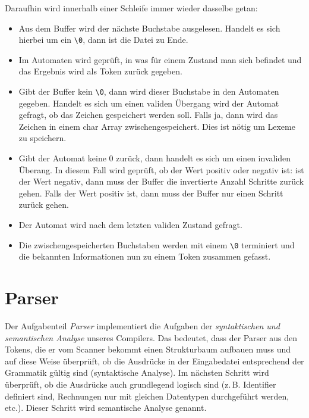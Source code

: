 \documentclass[listof=totoc,DIV11,a4paper]{scrreprt}
\begin{document}
Daraufhin wird innerhalb einer Schleife immer wieder dasselbe getan:
\begin{itemize}

\item Aus dem Buffer wird der nächste Buchstabe ausgelesen. Handelt es sich hierbei um ein \verb+\0+, dann ist die Datei zu Ende. 

\item Im Automaten wird geprüft, in was für einem Zustand man sich befindet und das Ergebnis wird als Token zurück gegeben.

\item Gibt der Buffer kein \verb+\0+, dann wird dieser Buchstabe in den Automaten gegeben. Handelt es sich um einen validen Übergang wird der Automat gefragt, ob das Zeichen gespeichert werden soll. Falls ja, dann wird das Zeichen in einem char Array zwischengespeichert. Dies ist nötig um Lexeme zu speichern.

\item Gibt der Automat keine 0 zurück, dann handelt es sich um einen invaliden Überang. In diesem Fall wird geprüft, ob der Wert positiv oder negativ ist: ist der Wert negativ, dann muss der Buffer die invertierte Anzahl Schritte zurück gehen. Falls der Wert positiv ist, dann muss der Buffer nur einen Schritt zurück gehen. 

\item Der Automat wird nach dem letzten validen Zustand gefragt. 

\item Die zwischengespeicherten Buchstaben werden mit einem \verb+\0+ terminiert und die bekannten Informationen nun zu einem Token zusammen gefasst.

\end{itemize}
\chapter{Parser}\label{kap:parser}
Der Aufgabenteil \emph{Parser} implementiert die Aufgaben der \emph{syntaktischen und semantischen Analyse} unseres Compilers. Das bedeutet, dass der Parser aus den Tokens, die er vom Scanner bekommt einen Strukturbaum aufbauen muss und auf diese Weise überprüft, ob die Ausdrücke in der Eingabedatei entsprechend der Grammatik gültig sind (syntaktische Analyse). Im nächsten Schritt wird überprüft, ob die Ausdrücke auch grundlegend logisch sind (z.\,B. Identifier definiert sind, Rechnungen nur mit gleichen Datentypen durchgeführt werden, etc.). Dieser Schritt wird semantische Analyse genannt.
\end{document}
